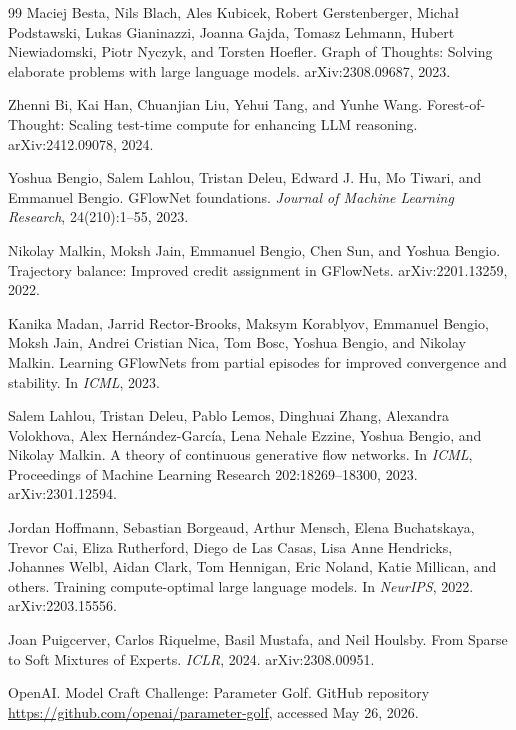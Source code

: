 \documentclass[11pt]{article}
\theoremstyle{definition}
\theoremstyle{plain}
\theoremstyle{remark}
\numberwithin{equation}{section}
\begin{document}
\begin{thebibliography}{99}
Maciej Besta, Nils Blach, Ales Kubicek, Robert Gerstenberger, Micha\l{} Podstawski, Lukas Gianinazzi, Joanna Gajda, Tomasz Lehmann, Hubert Niewiadomski, Piotr Nyczyk, and Torsten Hoefler.
\newblock Graph of Thoughts: Solving elaborate problems with large language models.
\newblock arXiv:2308.09687, 2023.

Zhenni Bi, Kai Han, Chuanjian Liu, Yehui Tang, and Yunhe Wang.
\newblock Forest-of-Thought: Scaling test-time compute for enhancing LLM reasoning.
\newblock arXiv:2412.09078, 2024.

Yoshua Bengio, Salem Lahlou, Tristan Deleu, Edward J. Hu, Mo Tiwari, and Emmanuel Bengio.
\newblock GFlowNet foundations.
\newblock \emph{Journal of Machine Learning Research}, 24(210):1--55, 2023.

Nikolay Malkin, Moksh Jain, Emmanuel Bengio, Chen Sun, and Yoshua Bengio.
\newblock Trajectory balance: Improved credit assignment in GFlowNets.
\newblock arXiv:2201.13259, 2022.

Kanika Madan, Jarrid Rector-Brooks, Maksym Korablyov, Emmanuel Bengio, Moksh Jain, Andrei Cristian Nica, Tom Bosc, Yoshua Bengio, and Nikolay Malkin.
\newblock Learning GFlowNets from partial episodes for improved convergence and stability.
\newblock In \emph{ICML}, 2023.

Salem Lahlou, Tristan Deleu, Pablo Lemos, Dinghuai Zhang, Alexandra Volokhova, Alex Hern\'andez-Garc\'ia, Lena Nehale Ezzine, Yoshua Bengio, and Nikolay Malkin.
\newblock A theory of continuous generative flow networks.
\newblock In \emph{ICML}, Proceedings of Machine Learning Research 202:18269--18300, 2023. arXiv:2301.12594.

Jordan Hoffmann, Sebastian Borgeaud, Arthur Mensch, Elena Buchatskaya, Trevor Cai, Eliza Rutherford, Diego de Las Casas, Lisa Anne Hendricks, Johannes Welbl, Aidan Clark, Tom Hennigan, Eric Noland, Katie Millican, and others.
\newblock Training compute-optimal large language models.
\newblock In \emph{NeurIPS}, 2022. arXiv:2203.15556.


Joan Puigcerver, Carlos Riquelme, Basil Mustafa, and Neil Houlsby.
\newblock From Sparse to Soft Mixtures of Experts.
\newblock \emph{ICLR}, 2024. arXiv:2308.00951.

OpenAI.
\newblock Model Craft Challenge: Parameter Golf.
\newblock GitHub repository \url{https://github.com/openai/parameter-golf}, accessed May 26, 2026.


\end{thebibliography}
\end{document}
